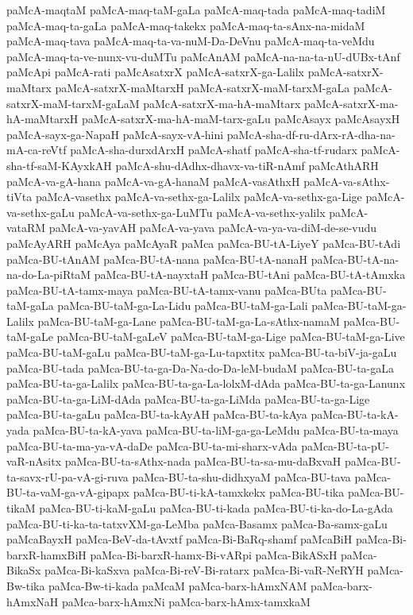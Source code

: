 {paMcA-maqtaM
paMcA-maq-taM-gaLa
paMcA-maq-tada
paMcA-maq-tadiM
paMcA-maq-ta-gaLa
paMcA-maq-takekx
paMcA-maq-ta-sAnx-na-midaM
paMcA-maq-tava
paMcA-maq-ta-va-nuM-Da-DeVnu
paMcA-maq-ta-veMdu
paMcA-maq-ta-ve-nunx-vu-duMTu
paMcAnAM
paMcA-na-na-ta-nU-dUBx-tAnf
paMcApi
paMcA-rati
paMcAsatxrX
paMcA-satxrX-ga-Lalilx
paMcA-satxrX-maMtarx
paMcA-satxrX-maMtarxH
paMcA-satxrX-maM-tarxM-gaLa
paMcA-satxrX-maM-tarxM-gaLaM
paMcA-satxrX-ma-hA-maMtarx
paMcA-satxrX-ma-hA-maMtarxH
paMcA-satxrX-ma-hA-maM-tarx-gaLu
paMcAsayx
paMcAsayxH
paMcA-sayx-ga-NapaH
paMcA-sayx-vA-hini
paMcA-sha-df-ru-dArx-rA-dha-na-mA-ca-reVtf
paMcA-sha-durxdArxH
paMcA-shatf
paMcA-sha-tf-rudarx
paMcA-sha-tf-saM-KAyxkAH
paMcA-shu-dAdhx-dhavx-va-tiR-nAmf
paMcAthARH
paMcA-va-gA-hana
paMcA-va-gA-hanaM
paMcA-vasAthxH
paMcA-va-sAthx-tiVta
paMcA-vasethx
paMcA-va-sethx-ga-Lalilx
paMcA-va-sethx-ga-Lige
paMcA-va-sethx-gaLu
paMcA-va-sethx-ga-LuMTu
paMcA-va-sethx-yalilx
paMcA-vataRM
paMcA-va-yavAH
paMcA-va-yava
paMcA-va-ya-va-diM-de-se-vudu
paMcAyARH
paMcAya
paMcAyaR
paMca
paMca-BU-tA-LiyeY
paMca-BU-tAdi
paMca-BU-tAnAM
paMca-BU-tA-nana
paMca-BU-tA-nanaH
paMca-BU-tA-na-na-do-La-piRtaM
paMca-BU-tA-nayxtaH
paMca-BU-tAni
paMca-BU-tA-tAmxka
paMca-BU-tA-tamx-maya
paMca-BU-tA-tamx-vanu
paMca-BUta
paMca-BU-taM-gaLa
paMca-BU-taM-ga-La-Lidu
paMca-BU-taM-ga-Lali
paMca-BU-taM-ga-Lalilx
paMca-BU-taM-ga-Lane
paMca-BU-taM-ga-La-sAthx-namaM
paMca-BU-taM-gaLe
paMca-BU-taM-gaLeV
paMca-BU-taM-ga-Lige
paMca-BU-taM-ga-Live
paMca-BU-taM-gaLu
paMca-BU-taM-ga-Lu-tapxtitx
paMca-BU-ta-biV-ja-gaLu
paMca-BU-tada
paMca-BU-ta-ga-Da-Na-do-Da-leM-budaM
paMca-BU-ta-gaLa
paMca-BU-ta-ga-Lalilx
paMca-BU-ta-ga-La-lolxM-dAda
paMca-BU-ta-ga-Lanunx
paMca-BU-ta-ga-LiM-dAda
paMca-BU-ta-ga-LiMda
paMca-BU-ta-ga-Lige
paMca-BU-ta-gaLu
paMca-BU-ta-kAyAH
paMca-BU-ta-kAya
paMca-BU-ta-kA-yada
paMca-BU-ta-kA-yava
paMca-BU-ta-liM-ga-ga-LeMdu
paMca-BU-ta-maya
paMca-BU-ta-ma-ya-vA-daDe
paMca-BU-ta-mi-sharx-vAda
paMca-BU-ta-pU-vaR-nAsitx
paMca-BU-ta-sAthx-nada
paMca-BU-ta-sa-mu-daBxvaH
paMca-BU-ta-savx-rU-pa-vA-gi-ruva
paMca-BU-ta-shu-didhxyaM
paMca-BU-tava
paMca-BU-ta-vaM-ga-vA-gipapx
paMca-BU-ti-kA-tamxkekx
paMca-BU-tika
paMca-BU-tikaM
paMca-BU-ti-kaM-gaLu
paMca-BU-ti-kada
paMca-BU-ti-ka-do-La-gAda
paMca-BU-ti-ka-ta-tatxvXM-ga-LeMba
paMca-Basamx
paMca-Ba-samx-gaLu
paMcaBayxH
paMca-BeV-da-tAvxtf
paMca-Bi-BaRq-shamf
paMcaBiH
paMca-Bi-barxR-hamxBiH
paMca-Bi-barxR-hamx-Bi-vARpi
paMca-BikASxH
paMca-BikaSx
paMca-Bi-kaSxva
paMca-Bi-reV-Bi-ratarx
paMca-Bi-vaR-NeRYH
paMca-Bw-tika
paMca-Bw-ti-kada
paMcaM
paMca-barx-hAmxNAM
paMca-barx-hAmxNaH
paMca-barx-hAmxNi
paMca-barx-hAmx-tamxkaM
}
